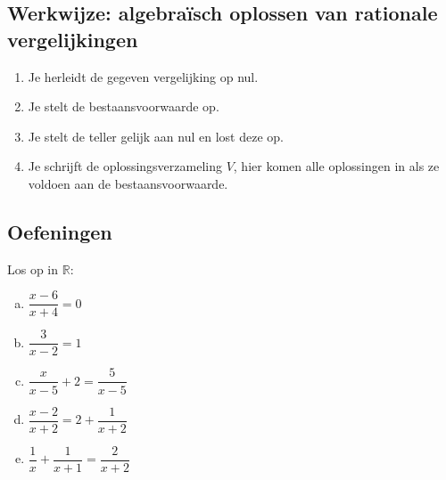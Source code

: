 \documentclass[a4paper,12pt]{article}
\begin{document}
\subsection{Werkwijze: algebraïsch oplossen van rationale vergelijkingen}
\begin{enumerate}[(1)]
\item Je herleidt de gegeven vergelijking op nul.
\item Je stelt de bestaansvoorwaarde op.
\item Je stelt de teller gelijk aan nul en lost deze op.
\item Je schrijft de oplossingsverzameling $V$, hier komen alle oplossingen in als ze voldoen aan de bestaansvoorwaarde.
\end{enumerate}

\subsection{Oefeningen}

\begin{oefening} %
Los op in $\mathbb{R}$:\\
\begin{enumerate}[(a)]
  \itemsep.4em
  \item $\dfrac{x-6}{x+4}=0$
  \item $\dfrac{3}{x-2}=1$
  \item $\dfrac{x}{x-5}+2=\dfrac{5}{x-5}$
  \item $\dfrac{x-2}{x+2}=2+\dfrac{1}{x+2}$
  \item $\dfrac{1}{x}+\dfrac{1}{x+1}=\dfrac{2}{x+2}$
\end{enumerate}
\end{oefening}
\end{document}
